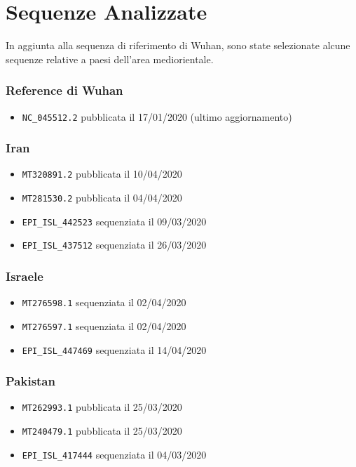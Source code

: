 \documentclass[11pt,italian]{article}
\begin{document}
\newpage
\section{Sequenze Analizzate}
In aggiunta alla sequenza di riferimento di Wuhan, sono state selezionate alcune sequenze relative a paesi dell'area mediorientale.

\subsubsection*{Reference di Wuhan}
\begin{itemize}
    \item \lstinline{NC_045512.2} pubblicata il 17/01/2020 (ultimo aggiornamento)
\end{itemize}

\subsubsection*{Iran}
\begin{itemize}
    \item \lstinline{MT320891.2} pubblicata il 10/04/2020
    \item \lstinline{MT281530.2} pubblicata il 04/04/2020
    \item \lstinline{EPI_ISL_442523} sequenziata il 09/03/2020
    \item \lstinline{EPI_ISL_437512} sequenziata il 26/03/2020
\end{itemize}

\subsubsection*{Israele}
\begin{itemize}
    \item \lstinline{MT276598.1} sequenziata il 02/04/2020
    \item \lstinline{MT276597.1} sequenziata il 02/04/2020
    \item \lstinline{EPI_ISL_447469} sequenziata il 14/04/2020
\end{itemize}

\subsubsection*{Pakistan}
\begin{itemize}
    \item \lstinline{MT262993.1} pubblicata il 25/03/2020
    \item \lstinline{MT240479.1} pubblicata il 25/03/2020
    \item \lstinline{EPI_ISL_417444} sequenziata il 04/03/2020
\end{itemize}
\end{document}
